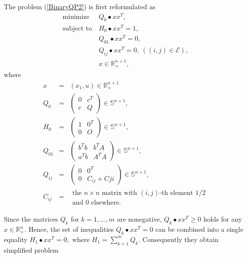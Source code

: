 \documentclass[12pt]{book}
\theoremstyle{definition}
\begin{document}
The problem (\ref{BinaryQP2}) is first reformulated as 
\begin{equation}
\label{BinaryQP2ref}
\begin{array}{ll}
\mbox{minimize}&\  Q_0\bullet xx^T ,\\
\mbox{subject to}&\  H_0\bullet xx^T = 1,\\
				 &\  Q_{01}\bullet xx^T = 0,\\
				 &\ Q_{ij}\bullet xx^T = 0, \ ((i,j)\in \mathcal{E}), \\
				 &\ x\in \mathbb{R}^{n+1}_+, 
\end{array}
\end{equation}
where 
\begin{eqnarray}
x &=& (x_1,u)\in\mathbb{R}^{n+1}_+ \\
Q_0 &=& \left(\begin{array}{rr} 0 & c^T \\ c & Q\end{array}\right) \in\mathbb{S}^{n+1},\\
H_0 &=& \left(\begin{array}{rr} 1 & 0^T \\ 0 & O\end{array}\right) \in\mathbb{S}^{n+1}, \\
Q_{01} &=& \left(\begin{array}{rr} b^Tb & b^TA \\ a^Tb & A^TA\end{array}\right) \in\mathbb{S}^{n+1},\\
Q_{ij} &=& \left(\begin{array}{cc} 0 & 0^T \\ 0 & C_{ij} + C{ji}\end{array}\right) \in\mathbb{S}^{n+1},\\
C_{ij} &=& \begin{array}{l} \mbox{the } n\times n\mbox{ matrix with } (i,j)\mbox{-th element 1/2}\\ \mbox{and 0 elsewhere.} \end{array}
\end{eqnarray}



Since the matrices $Q_k$ for $k=1,\dots, m$ are nonegative, $Q_k\bullet xx^T\geq 0 $ holds for any $x\in \mathbb{R}^n_+$. Hence, the set of inequalities $Q_k\bullet xx^T = 0$ can be combined into a single equality $H_1\bullet xx^T = 0, $ where $H_1 = \sum_{k=1}^m Q_k.$
Consequently they obtain simplified problem
\end{document}
